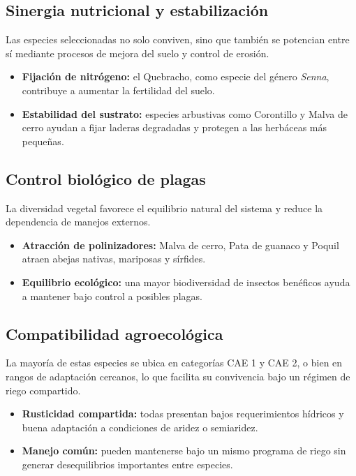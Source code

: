 \documentclass[11pt,a4paper]{article}
\begin{document}
\subsection{Sinergia nutricional y estabilización}
Las especies seleccionadas no solo conviven, sino que también se potencian entre sí mediante procesos de mejora del suelo y control de erosión.
\begin{itemize}[leftmargin=1.2cm]
    \item \textbf{Fijación de nitrógeno:} el Quebracho, como especie del género \textit{Senna}, contribuye a aumentar la fertilidad del suelo.
    \item \textbf{Estabilidad del sustrato:} especies arbustivas como Corontillo y Malva de cerro ayudan a fijar laderas degradadas y protegen a las herbáceas más pequeñas.
\end{itemize}

\subsection{Control biológico de plagas}
La diversidad vegetal favorece el equilibrio natural del sistema y reduce la dependencia de manejos externos.
\begin{itemize}[leftmargin=1.2cm]
    \item \textbf{Atracción de polinizadores:} Malva de cerro, Pata de guanaco y Poquil atraen abejas nativas, mariposas y sírfides.
    \item \textbf{Equilibrio ecológico:} una mayor biodiversidad de insectos benéficos ayuda a mantener bajo control a posibles plagas.
\end{itemize}

\subsection{Compatibilidad agroecológica}
La mayoría de estas especies se ubica en categorías CAE 1 y CAE 2, o bien en rangos de adaptación cercanos, lo que facilita su convivencia bajo un régimen de riego compartido.
\begin{itemize}[leftmargin=1.2cm]
    \item \textbf{Rusticidad compartida:} todas presentan bajos requerimientos hídricos y buena adaptación a condiciones de aridez o semiaridez.
    \item \textbf{Manejo común:} pueden mantenerse bajo un mismo programa de riego sin generar desequilibrios importantes entre especies.
\end{itemize}
\end{document}
